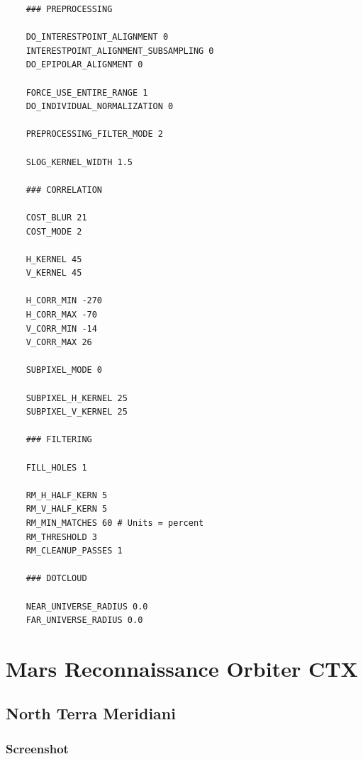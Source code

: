 \begin{verbatim}
    ### PREPROCESSING

    DO_INTERESTPOINT_ALIGNMENT 0
    INTERESTPOINT_ALIGNMENT_SUBSAMPLING 0
    DO_EPIPOLAR_ALIGNMENT 0

    FORCE_USE_ENTIRE_RANGE 1
    DO_INDIVIDUAL_NORMALIZATION 0

    PREPROCESSING_FILTER_MODE 2

    SLOG_KERNEL_WIDTH 1.5

    ### CORRELATION

    COST_BLUR 21
    COST_MODE 2

    H_KERNEL 45
    V_KERNEL 45

    H_CORR_MIN -270
    H_CORR_MAX -70
    V_CORR_MIN -14
    V_CORR_MAX 26

    SUBPIXEL_MODE 0

    SUBPIXEL_H_KERNEL 25
    SUBPIXEL_V_KERNEL 25

    ### FILTERING

    FILL_HOLES 1

    RM_H_HALF_KERN 5
    RM_V_HALF_KERN 5
    RM_MIN_MATCHES 60 # Units = percent
    RM_THRESHOLD 3
    RM_CLEANUP_PASSES 1

    ### DOTCLOUD

    NEAR_UNIVERSE_RADIUS 0.0
    FAR_UNIVERSE_RADIUS 0.0
\end{verbatim}


\section{Mars Reconnaissance Orbiter CTX}

\subsection{North Terra Meridiani}

\subsubsection*{Screenshot}

